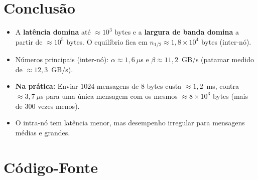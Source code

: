 \documentclass[a4paper,12pt]{article}
\begin{document}
\section{Conclusão}

\begin{itemize}
    \item A \textbf{latência domina} até $\approx 10^3$ bytes e a
          \textbf{largura de banda domina} a partir de $\approx 10^5$ bytes.
          O equilíbrio fica em $n_{1/2}\approx 1{,}8\times 10^4$ bytes
          (inter-nó).
    \item Números principais (inter-nó): $\alpha\approx 1{,}6~\mu$s e
          $\beta\approx 11{,}2$~GB/s (patamar medido de $\approx 12{,}3$~GB/s).
    \item \textbf{Na prática:} Enviar $1024$
          mensagens de $8$ bytes custa $\approx 1{,}2$~ms, contra
          $\approx 3{,}7~\mu$s para uma única mensagem com os mesmos
          $\approx 8\times 10^3$ bytes (mais de $300$ vezes menos).
    \item O intra-nó tem latência menor, mas desempenho irregular para
          mensagens médias e grandes.
\end{itemize}

\newpage
\appendix

\section{Código-Fonte}




\end{document}
